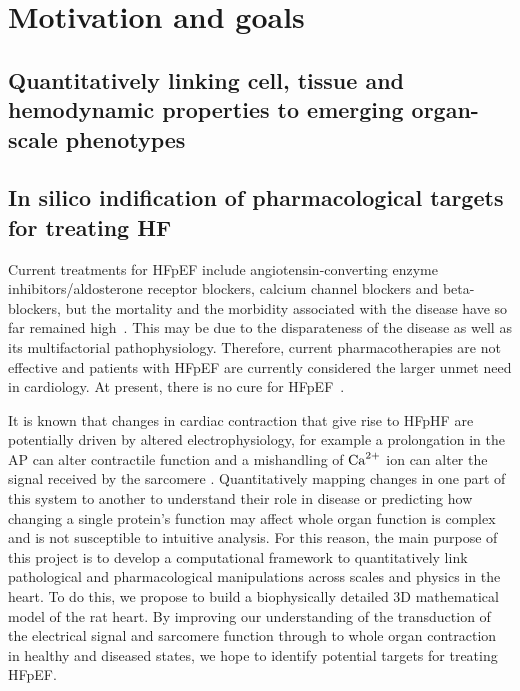 %
%
%
\section{Motivation and goals}


%
%
%
\subsection{Quantitatively linking cell, tissue and hemodynamic properties to emerging organ-scale phenotypes}

%
%
%
\subsection{In silico indification of pharmacological targets for treating HF}
Current treatments for HFpEF include angiotensin-converting enzyme inhibitors/aldosterone receptor blockers, calcium channel
blockers and beta-blockers, but the mortality and the morbidity associated with the
disease have so far remained high~\cite{Adamczak:2020}. This may be due to the disparateness of the disease as well as its multifactorial pathophysiology. Therefore, current pharmacotherapies are not effective and patients with HFpEF are
currently considered the larger unmet need in cardiology. At present, there is no cure for HFpEF~\cite{Owan:2006}.

\vspace{0.2cm}
It is known that changes in cardiac contraction that give rise to HFpHF are potentially driven by altered electrophysiology, for example a prolongation in the AP can alter contractile function and a mishandling of $\textrm{Ca}^{2+}$ ion can alter the signal received by the sarcomere \cite{Asp:2013, Gorski:2015}. Quantitatively mapping changes in one part of this system to another to understand their role in disease or predicting how changing a single protein's function may affect whole organ function is complex and is not susceptible to intuitive analysis. For this reason, the main purpose of this project is to develop a computational framework to quantitatively link pathological and pharmacological manipulations across scales and physics in the heart. To do this, we propose to build a biophysically detailed $3$D mathematical model of the rat heart. By improving our understanding of the transduction of the electrical signal and sarcomere function through to whole organ contraction in healthy and diseased states, we hope to identify potential targets for treating HFpEF.












